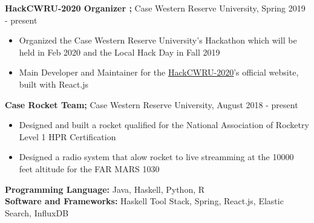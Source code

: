 \documentclass[a4paper,11pt]{article}
\begin{document}
\begin{flushleft}
	
	\textbf{HackCWRU-2020 Organizer ; } Case Western Reserve University, Spring 2019 - 
	present
	\vspace{-\topsep}
	\begin{itemize}
		\setlength{\parskip}{0pt}
		\setlength{\itemsep}{0pt plus 1pt}
		\item Organized the Case Western Reserve University's Hackathon which will be held in Feb 2020 and the Local Hack Day in Fall 2019 \\
		\item Main Developer and Maintainer for the \href{https://hackcwru.github.io/HackCWRU2020-Website/}{HackCWRU-2020}'s official website, built with React.js
	\end{itemize}

	\textbf{Case Rocket Team; } Case Western Reserve University, August 2018 - present
	\vspace{-\topsep}
	\begin{itemize}
		\setlength{\parskip}{0pt}
		\setlength{\itemsep}{0pt plus 1pt}
		\item Designed and built a rocket qualified for the National Association of Rocketry Level 1 HPR Certification
		\item Designed a radio system that alow rocket to live streamming at the 10000 feet altitude for the FAR MARS 1030
	\end{itemize}
	
\vspace{-\topsep}
\centering{\noindent\makebox{\rule{8cm}{1.5pt}}}
\end{flushleft} 

\begin{flushleft}
	\textbf{Programming Language:} Java, Haskell, Python, R \\ 
	\doublespacing
	\textbf{Software and Frameworks:} Haskell Tool Stack, Spring, React.js, Elastic Search, InfluxDB \\
\vspace{-\topsep}
\centering{\noindent\makebox{\rule{8cm}{1.5pt}}}
\end{flushleft}
\end{document}
